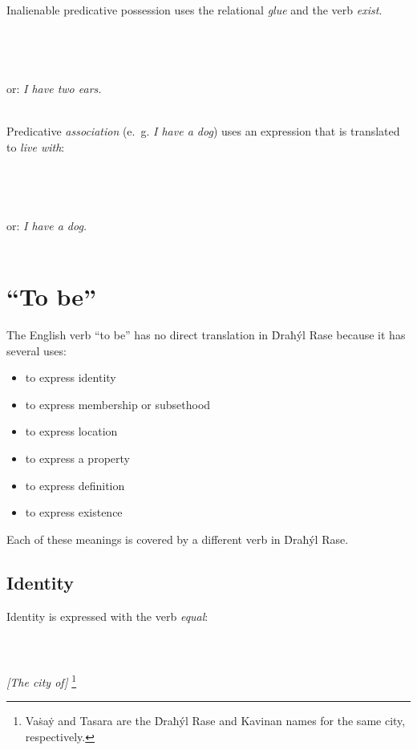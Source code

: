 \documentclass{book}
\begin{document}
Inalienable predicative possession uses the relational  \emph{glue} and the verb  \emph{exist}. \\
~\\
   \\
   \\
\emph{   } \\
or: \emph{I have two ears.} \\
~

Predicative \emph{association} (e.~g. \emph{I have a dog}) uses an expression that is translated to \emph{live with}: \\
~\\
  \\
  \\
  \\
or: \emph{I have a dog.} \\
~

\section{``To be''}

The English verb ``to be'' has no direct translation in Ḋraħýl Rase because it has several uses:

\begin{itemize}
    \item to express identity
    \item to express membership or subsethood
    \item to express location
    \item to express a property
    \item to express definition    
    \item to express existence
\end{itemize}

Each of these meanings is covered by a different verb in Ḋraħýl Rase.

\subsection{Identity}

Identity is expressed with the verb  \emph{equal}: \\
~\\
   \\
   \\
\emph{[The city of]   }\footnote{Vaṡaẏ and Tasara are the Ḋraħýl Rase and Kavinan names for the same city, respectively.}
\end{document}
